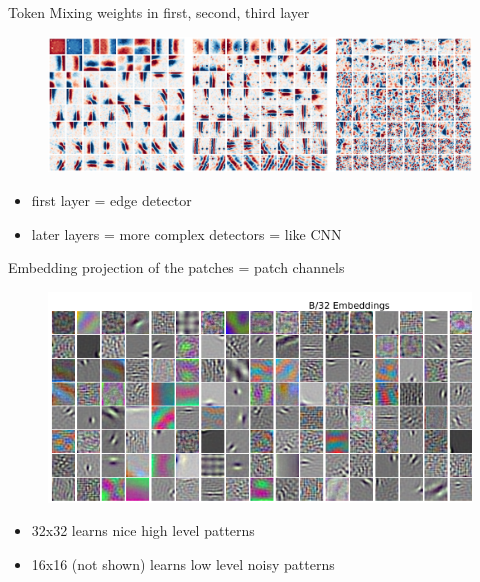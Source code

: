 \documentclass{beamer}
\begin{document}
\begin{frame}{Token Mixing weights in first, second, third layer}

\begin{figure}[h]
\includegraphics[width=\textwidth]{img/filters}
\end{figure}

\begin{itemize}
\item first layer = edge detector
\item later layers = more complex detectors = like CNN
\end{itemize}

\end{frame}
\begin{frame}{Embedding projection of the patches = patch channels}

\begin{figure}[h]
\includegraphics[width=\textwidth]{img/projections}
\end{figure}

\begin{itemize}
\item 32x32 learns nice high level patterns
\item 16x16 (not shown) learns low level noisy patterns
\end{itemize}

\end{frame}
\end{document}
